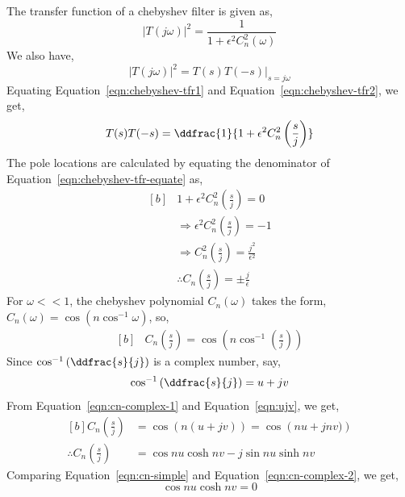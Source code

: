 The transfer function of a chebyshev filter is given as,
\begin{equation}
   |T(j\omega)|^2=\frac{1}{1+\epsilon^2C_n^2(\omega)}
   \label{eqn:chebyshev-tfr1}
\end{equation}
We also have,
\begin{equation}
    |T(j\omega)|^2=T(s)T(-s)|_{s=j\omega}
    \label{eqn:chebyshev-tfr2}
 \end{equation}
Equating Equation~\ref{eqn:chebyshev-tfr1} and Equation~\ref{eqn:chebyshev-tfr2}, we get,
\begin{equation}
    T(s)T(-s)=\ddfrac{1}{1+\epsilon^2C_n^2\left(\frac{s}{j}\right)}
    \label{eqn:chebyshev-tfr-equate}
\end{equation}
The pole locations are calculated by equating the denominator of Equation~\ref{eqn:chebyshev-tfr-equate} as,
\begin{equation}
    \begin{aligned}[b]
        &1+\epsilon^2C_n^2\left(\frac{s}{j}\right)=0\\
        &\Rightarrow \epsilon^2C_n^2\left(\frac{s}{j}\right)=-1\\
        &\Rightarrow C_n^2\left(\frac{s}{j}\right)=\frac{j^2}{\epsilon^2}\\
        &\therefore C_n\left(\frac{s}{j}\right)=\pm \frac{j}{\epsilon}
    \end{aligned}
    \label{eqn:cn-simple}
\end{equation}
For $\omega<<1$, the chebyshev polynomial $C_n(\omega)$ takes the form, $C_n(\omega)=\cos (n \cos^{-1}\omega)$, so, 
\begin{equation}
   \begin{aligned}[b]
    &C_n\left(\frac{s}{j}\right)=\cos\left(n\cos^{-1}\left(\frac{s}{j}\right)\right)
   \end{aligned}
   \label{eqn:cn-complex-1}
\end{equation}
Since $\cos^{-1}\left(\ddfrac{s}{j}\right)$ is a complex number, say,
\begin{equation}
    \cos^{-1}\left(\ddfrac{s}{j}\right)=u+jv
    \label{eqn:ujv}
\end{equation}
From Equation~\ref{eqn:cn-complex-1} and Equation~\ref{eqn:ujv}, we get,
\begin{equation}
    \begin{aligned}[b]
        C_n\left(\frac{s}{j}\right)&=\cos\left(n(u+jv)\right)=\cos\left(nu+jnv)\right)\\
    \therefore C_n\left(\frac{s}{j}\right)&=\cos nu \cosh nv - j \sin nu \sinh nv
    \end{aligned}
    \label{eqn:cn-complex-2}
\end{equation}
Comparing Equation~\ref{eqn:cn-simple} and Equation~\ref{eqn:cn-complex-2}, we get,
\begin{equation}
    \cos nu \cosh nv =0
    \label{eqn:cosn}
\end{equation}

